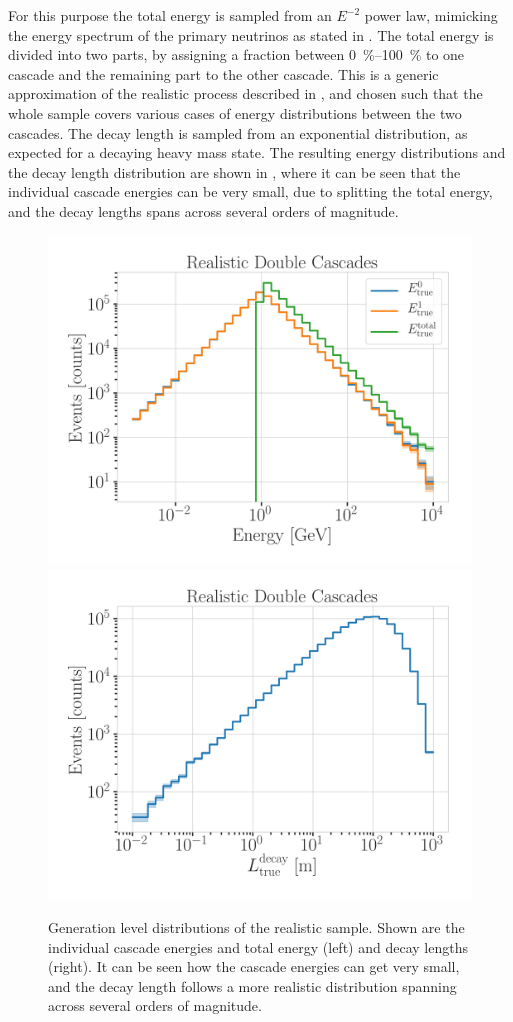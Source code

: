 For this purpose the total energy is sampled from an $E^{-2}$ power law, mimicking the energy spectrum of the primary neutrinos as stated in . The total energy is divided into two parts, by assigning a fraction between \SIrange[range-phrase={~and~}]{0}{100}{\percent} to one cascade and the remaining part to the other cascade. This is a generic approximation of the realistic process described in , and chosen such that the whole sample covers various cases of energy distributions between the two cascades. The decay length is sampled from an exponential distribution, as expected for a decaying heavy mass state. The resulting energy distributions and the decay length distribution are shown in , where it can be seen that the individual cascade energies can be very small, due to splitting the total energy, and the decay lengths spans across several orders of magnitude.

\begin{figure}[h]
    \includegraphics[width=.49\linewidth]{figures/model_independent_simulation/gen_level/194603_gen_level_1_d_distr_all_energies.png}
    \includegraphics[width=.49\linewidth]{figures/model_independent_simulation/gen_level/194603_gen_level_1_d_distr_true_decay_length.png}
    \caption[Realistic model-independent simulation generation level distributions]{Generation level distributions of the realistic sample. Shown are the individual cascade energies and total energy (left) and decay lengths (right). It can be seen how the cascade energies can get very small, and the decay length follows a more realistic distribution spanning across several orders of magnitude.}
\end{figure}

